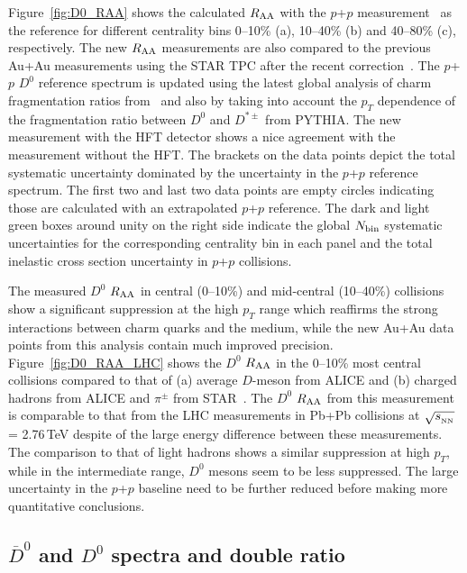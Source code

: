 \documentclass[%
 reprint,	
 amsmath,amssymb,
 aps,
 prc,
]{revtex4-1}
\begin{document}
Figure~\ref{fig:D0_RAA} shows the calculated $R_{\rm AA}$ with the $p$+$p$ measurement~\cite{Star_D_pp} as the reference for different centrality bins 0--10\% (a), 10--40\% (b) and 40--80\% (c), respectively. The new $R_{\rm AA}$ measurements are also compared to the previous Au+Au measurements using the STAR TPC after the recent correction~\cite{Star_D_RAA}. The $p$+$p$ $D^0$ reference spectrum is updated using the latest global analysis of charm fragmentation ratios from~\cite{charm_frag} and also by taking into account the $p_T$ dependence of the fragmentation ratio between $D^0$ and $D^{*\pm}$ from PYTHIA. The new measurement with the HFT detector shows a nice agreement with the measurement without the HFT. The brackets on the data points depict the total systematic uncertainty dominated by the uncertainty in the $p$+$p$ reference spectrum. The first two and last two data points are empty circles indicating those are calculated with an extrapolated $p$+$p$ reference. The dark and light green boxes around unity on the right side indicate the global $N_{\rm bin}$ systematic uncertainties for the corresponding centrality bin in each panel and the total inelastic cross section uncertainty in $p$+$p$ collisions.

The measured $D^0$ $R_{\rm AA}$ in central (0--10\%) and mid-central (10--40\%) collisions show a significant suppression at the high $p_{T}$ range which reaffirms the strong interactions between charm quarks and the medium, while the new Au+Au data points from this analysis contain much improved precision. Figure~\ref{fig:D0_RAA_LHC} shows the $D^0$ $R_{\rm AA}$ in the 0--10\% most central collisions compared to that of (a) average $D$-meson from ALICE and (b) charged hadrons from ALICE and $\pi^{\pm}$ from STAR~\cite{Alice_D_RAA_2,Alice_hadron_RAA,PhenixPi0}. The $D^0$ $R_{\rm AA}$ from this measurement is comparable to that from the LHC measurements in Pb+Pb collisions at $\sqrt{s_{_{\rm NN}}}$ = 2.76\,TeV despite of the large energy difference between these measurements.
The comparison to that of light hadrons shows a similar suppression at high $p_{T}$, while in the intermediate range, $D^0$ mesons seem to be less suppressed. The large uncertainty in the $p$+$p$ baseline need to be further reduced before making more quantitative conclusions.


\subsection{$\overline{D}^{0}$ and $D^{0}$ spectra and double ratio}
\label{result:D0barD0ratio} 
\end{document}
